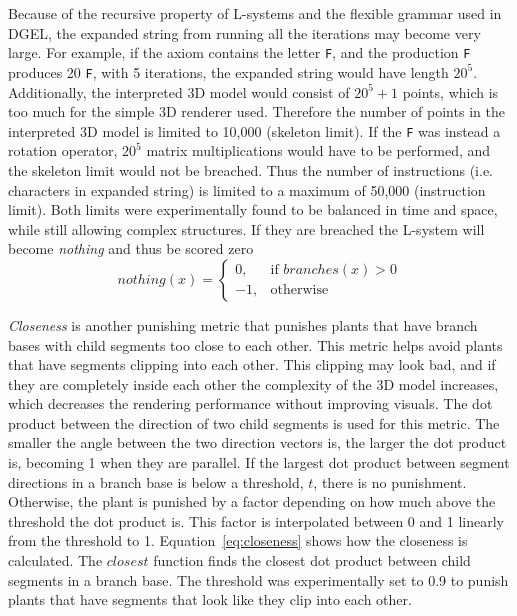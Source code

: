 Because of the recursive property of \glspl{L-system} and the flexible grammar used in \gls{DGEL}, the expanded string from running all the iterations may become very large.
For example, if the axiom contains the letter \texttt{F}, and the production \texttt{F} produces 20 \texttt{F}, with 5 iterations, the expanded string would have length $20^5$.
Additionally, the interpreted 3D model would consist of $20^5 + 1$ points, which is too much for the simple 3D renderer used.
Therefore the number of points in the interpreted 3D model is limited to 10,000 (skeleton limit).
If the \texttt{F} was instead a rotation operator, $20^5$ matrix multiplications would have to be performed, and the skeleton limit would not be breached.
Thus the number of instructions (i.e. characters in expanded string) is limited to a maximum of 50,000 (instruction limit).
Both limits were experimentally found to be balanced in time and space, while still allowing complex structures.
If they are breached the \gls{L-system} will become \textit{nothing} and thus be scored zero
\begin{equation}
\label{eq:nothing}
    nothing(x) =
    \begin{cases}
        0,& \text{if } branches(x) > 0  \\
        -1,& \text{otherwise}
    \end{cases}
\end{equation}

\textit{Closeness} is another punishing metric that punishes plants that have \glspl{branch base} with \glspl{child segment} too close to each other.
This metric helps avoid plants that have segments clipping into each other.
This clipping may look bad, and if they are completely inside each other the complexity of the 3D model increases, which decreases the rendering performance without improving visuals.
The dot product between the direction of two \glspl{child segment} is used for this metric.
The smaller the angle between the two direction vectors is, the larger the dot product is, becoming 1 when they are parallel.
If the largest dot product between segment directions in a \gls{branch base} is below a threshold, $t$, there is no punishment.
Otherwise, the plant is punished by a factor depending on how much above the threshold the dot product is.
This factor is interpolated between 0 and 1 linearly from the threshold to 1.
Equation~\ref{eq:closeness} shows how the closeness is calculated.
The $closest$ function finds the closest dot product between \glspl{child segment} in a \gls{branch base}.
The threshold was experimentally set to 0.9 to punish plants that have segments that look like they clip into each other.

